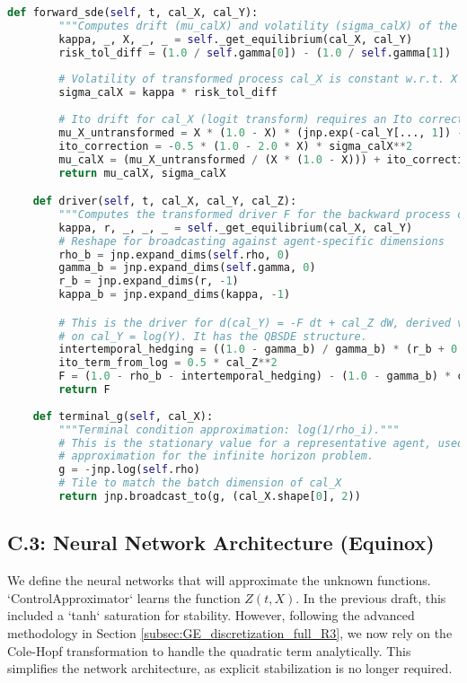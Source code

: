 \begin{lstlisting}[language=Python, caption={C.2: Transformed Lucas Model FBSDE Coefficients in JAX.}, label={lst:lucas_jax_transformed_app_appendix}]
    def forward_sde(self, t, cal_X, cal_Y):
        """Computes drift (mu_calX) and volatility (sigma_calX) of the transformed forward process."""
        kappa, _, X, _, _ = self._get_equilibrium(cal_X, cal_Y)
        risk_tol_diff = (1.0 / self.gamma[0]) - (1.0 / self.gamma[1])
        
        # Volatility of transformed process cal_X is constant w.r.t. X
        sigma_calX = kappa * risk_tol_diff
        
        # Ito drift for cal_X (logit transform) requires an Ito correction term
        mu_X_untransformed = X * (1.0 - X) * (jnp.exp(-cal_Y[..., 1]) - jnp.exp(-cal_Y[..., 0]))
        ito_correction = -0.5 * (1.0 - 2.0 * X) * sigma_calX**2
        mu_calX = (mu_X_untransformed / (X * (1.0 - X))) + ito_correction
        return mu_calX, sigma_calX

    def driver(self, t, cal_X, cal_Y, cal_Z):
        """Computes the transformed driver F for the backward process cal_Y."""
        kappa, r, _, _, _ = self._get_equilibrium(cal_X, cal_Y)
        # Reshape for broadcasting against agent-specific dimensions
        rho_b = jnp.expand_dims(self.rho, 0)
        gamma_b = jnp.expand_dims(self.gamma, 0)
        r_b = jnp.expand_dims(r, -1)
        kappa_b = jnp.expand_dims(kappa, -1)

        # This is the driver for d(cal_Y) = -F dt + cal_Z dW, derived via Ito's lemma
        # on cal_Y = log(Y). It has the QBSDE structure.
        intertemporal_hedging = ((1.0 - gamma_b) / gamma_b) * (r_b + 0.5 * gamma_b * kappa_b**2)
        ito_term_from_log = 0.5 * cal_Z**2
        F = (1.0 - rho_b - intertemporal_hedging) - (1.0 - gamma_b) * cal_Z * kappa_b + ito_term_from_log
        return F
        
    def terminal_g(self, cal_X):
        """Terminal condition approximation: log(1/rho_i)."""
        # This is the stationary value for a representative agent, used as an
        # approximation for the infinite horizon problem.
        g = -jnp.log(self.rho)
        # Tile to match the batch dimension of cal_X
        return jnp.broadcast_to(g, (cal_X.shape[0], 2))
\end{lstlisting}

\subsection{C.3: Neural Network Architecture (Equinox)}
We define the neural networks that will approximate the unknown functions. `ControlApproximator` learns the function \(Z(t,X)\). In the previous draft, this included a `tanh` saturation for stability. However, following the advanced methodology in Section \ref{subsec:GE_discretization_full_R3}, we now rely on the Cole-Hopf transformation to handle the quadratic term analytically. This simplifies the network architecture, as explicit stabilization is no longer required.

